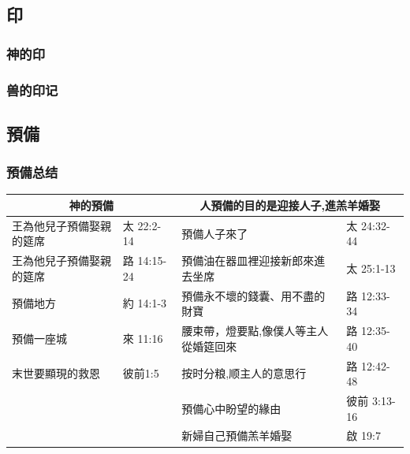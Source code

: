 \subsection{印}
\subsubsection{神的印}
\subsubsection{兽的印记}












\subsection{預備}
\subsubsection{預備总结}
\begin{table}[H]
\centering
\begin{tabular}{l|l|l|l}\hline
\multicolumn{2}{c|}{神的預備} & \multicolumn{2}{c}{人預備的目的是迎接人子,進羔羊婚娶} \\\hline\hline
王為他兒子預備娶親的筵席& 太 22:2-14&預備人子來了& 太 24:32-44\\\hline
王為他兒子預備娶親的筵席& 路 14:15-24&預備油在器皿裡迎接新郎來進去坐席& 太 25:1-13\\\hline
預備地方& 約 14:1-3&預備永不壞的錢囊、用不盡的財寶& 路 12:33-34\\\hline
預備一座城& 來 11:16&腰束帶，燈要點,像僕人等主人從婚筵回來& 路 12:35-40\\\hline
末世要顯現的救恩& 彼前1:5&按时分粮,顺主人的意思行& 路 12:42-48\\\hline
&&預備心中盼望的緣由& 彼前 3:13-16\\\hline
&&新婦自己預備羔羊婚娶& 啟 19:7\\\hline\hline
\end{tabular}
\end{table}
 


